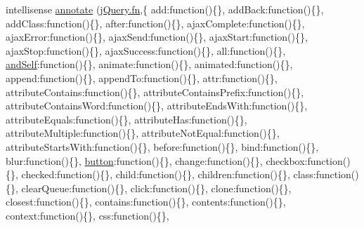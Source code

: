 \begin{DoxyCompactItemize}
\item 
intellisense \hyperlink{jquery-1_810_82_8intellisense_8js_abcf3dc0ac27677031e769f329e49d75a}{annotate} (\hyperlink{_scripts_2jquery-1_810_82_8min_8js_a37b9e1ceee4c6d2616fa6081784b5468}{j\+Query.\+fn},\{ \textquotesingle{}add\textquotesingle{}\+:function()\{\}, \textquotesingle{}add\+Back\textquotesingle{}\+:function()\{\}, \textquotesingle{}add\+Class\textquotesingle{}\+:function()\{\}, \textquotesingle{}after\textquotesingle{}\+:function()\{\}, \textquotesingle{}ajax\+Complete\textquotesingle{}\+:function()\{\}, \textquotesingle{}ajax\+Error\textquotesingle{}\+:function()\{\}, \textquotesingle{}ajax\+Send\textquotesingle{}\+:function()\{\}, \textquotesingle{}ajax\+Start\textquotesingle{}\+:function()\{\}, \textquotesingle{}ajax\+Stop\textquotesingle{}\+:function()\{\}, \textquotesingle{}ajax\+Success\textquotesingle{}\+:function()\{\}, \textquotesingle{}all\textquotesingle{}\+:function()\{\}, \textquotesingle{}\hyperlink{_scripts_2jquery-1_810_82_8js_a63df20b949f6e6fc37d300a41fd9c02b}{and\+Self}\textquotesingle{}\+:function()\{\}, \textquotesingle{}animate\textquotesingle{}\+:function()\{\}, \textquotesingle{}animated\textquotesingle{}\+:function()\{\}, \textquotesingle{}append\textquotesingle{}\+:function()\{\}, \textquotesingle{}append\+To\textquotesingle{}\+:function()\{\}, \textquotesingle{}attr\textquotesingle{}\+:function()\{\}, \textquotesingle{}attribute\+Contains\textquotesingle{}\+:function()\{\}, \textquotesingle{}attribute\+Contains\+Prefix\textquotesingle{}\+:function()\{\}, \textquotesingle{}attribute\+Contains\+Word\textquotesingle{}\+:function()\{\}, \textquotesingle{}attribute\+Ends\+With\textquotesingle{}\+:function()\{\}, \textquotesingle{}attribute\+Equals\textquotesingle{}\+:function()\{\}, \textquotesingle{}attribute\+Has\textquotesingle{}\+:function()\{\}, \textquotesingle{}attribute\+Multiple\textquotesingle{}\+:function()\{\}, \textquotesingle{}attribute\+Not\+Equal\textquotesingle{}\+:function()\{\}, \textquotesingle{}attribute\+Starts\+With\textquotesingle{}\+:function()\{\}, \textquotesingle{}before\textquotesingle{}\+:function()\{\}, \textquotesingle{}bind\textquotesingle{}\+:function()\{\}, \textquotesingle{}blur\textquotesingle{}\+:function()\{\}, \textquotesingle{}\hyperlink{_scripts_2bootstrap_8min_8js_a55e170814e74f6c3db8ae9ea3ba9054f}{button}\textquotesingle{}\+:function()\{\}, \textquotesingle{}change\textquotesingle{}\+:function()\{\}, \textquotesingle{}checkbox\textquotesingle{}\+:function()\{\}, \textquotesingle{}checked\textquotesingle{}\+:function()\{\}, \textquotesingle{}child\textquotesingle{}\+:function()\{\}, \textquotesingle{}children\textquotesingle{}\+:function()\{\}, \textquotesingle{}class\textquotesingle{}\+:function()\{\}, \textquotesingle{}clear\+Queue\textquotesingle{}\+:function()\{\}, \textquotesingle{}click\textquotesingle{}\+:function()\{\}, \textquotesingle{}clone\textquotesingle{}\+:function()\{\}, \textquotesingle{}closest\textquotesingle{}\+:function()\{\}, \textquotesingle{}contains\textquotesingle{}\+:function()\{\}, \textquotesingle{}contents\textquotesingle{}\+:function()\{\}, \textquotesingle{}context\textquotesingle{}\+:function()\{\}, \textquotesingle{}css\textquotesingle{}\+:function()\{\}, 
\end{DoxyCompactItemize}
